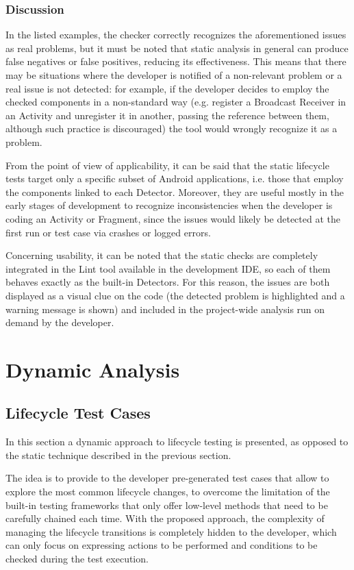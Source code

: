 \documentclass[11pt,a4paper,notitlepage]{article}
\begin{document}
\subsubsection{Discussion}
In the listed examples, the checker correctly recognizes the aforementioned issues as real problems, but it must be noted that static analysis in general can produce false negatives or false positives, reducing its effectiveness. This means that there may be situations where the developer is notified of a non-relevant problem or a real issue is not detected: for example, if the developer decides to employ the checked components in a non-standard way (e.g. register a Broadcast Receiver in an Activity and unregister it in another, passing the reference between them, although such practice is discouraged) the tool would wrongly recognize it as a problem.

From the point of view of applicability, it can be said that the static lifecycle tests target only a specific subset of Android applications, i.e. those that employ the components linked to each Detector. Moreover, they are useful mostly in the early stages of development to recognize inconsistencies when the developer is coding an Activity or Fragment, since the issues would likely be detected at the first run or test case via crashes or logged errors.

Concerning usability, it can be noted that the static checks are completely integrated in the Lint tool available in the development IDE, so each of them behaves exactly as the built-in Detectors. For this reason, the issues are both displayed as a visual clue on the code (the detected problem is highlighted and a warning message is shown) and included in the project-wide analysis run on demand by the developer.


\section{Dynamic Analysis}\label{section_lifecycle_dynamic}

\subsection{Lifecycle Test Cases}
In this section a dynamic approach to lifecycle testing is presented, as opposed to the static technique described in the previous section.

The idea is to provide to the developer pre-generated test cases that allow to explore the most common lifecycle changes, to overcome the limitation of the built-in testing frameworks that only offer low-level methods that need to be carefully chained each time. With the proposed approach, the complexity of managing the lifecycle transitions is completely hidden to the developer, which can only focus on expressing actions to be performed and conditions to be checked during the test execution.
\end{document}
